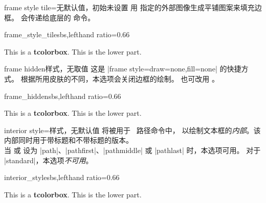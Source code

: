 \clearpage
\begin{docTcbKey}{frame style tile}{=}{无默认值，初始未设置}
  用  指定的外部图像生成平铺图案来填充边框。
  会传递给底层的  命令。
\begin{exdispExample*}{frame_style_tile}{sbs,lefthand ratio=0.66}

\begin{tcolorbox}[enhanced,title=My title,
  frame style tile={width=1cm}{pink_marble.png}]
This is a \textbf{tcolorbox}.
\tcblower
This is the lower part.
\end{tcolorbox}
\end{exdispExample*}
\end{docTcbKey}


\begin{docTcbKey}{frame hidden}{}{样式，无取值}
  这是 |frame style={draw=none,fill=none}| 的快捷方式。
  根据所用皮肤的不同，本选项会关闭边框的绘制。
  也可改用 。
\begin{exdispExample*}{frame_hidden}{sbs,lefthand ratio=0.66}

\begin{tcolorbox}[enhanced,title=My title,
  frame hidden]
This is a \textbf{tcolorbox}.
\tcblower
This is the lower part.
\end{tcolorbox}
\end{exdispExample*}
\end{docTcbKey}


\begin{docTcbKey}{interior style}{=}{样式，无默认值}
  将被用于 \tikzname\ 路径命令中，
  以绘制文本框的\emph{内部}。该内部同时用于带标题和不带标题的版本。\\
  当 
  或  设为
  |path|、|pathfirst|、|pathmiddle| 或 |pathlast| 时，本选项可用。
  对于 |standard|，本选项\emph{不可用}。
\begin{exdispExample*}{interior_style}{sbs,lefthand ratio=0.66}

\begin{tcolorbox}[enhanced,title=My title,
  interior style={left color=red!20!white,
                  right color=yellow!50!white}]
This is a \textbf{tcolorbox}.
\tcblower
This is the lower part.
\end{tcolorbox}
\end{exdispExample*}
\end{docTcbKey}

